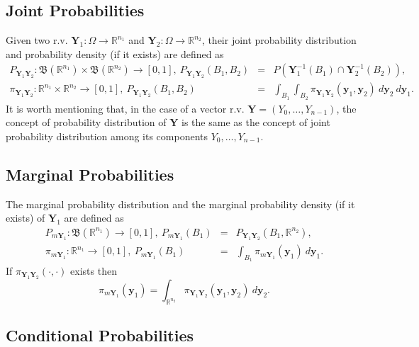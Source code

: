 \subsection{Joint Probabilities}

Given two r.v. $\mathbf{Y}_1:\Omega\rightarrow\mathbb{R}^{n_1}$ and $\mathbf{Y}_2:\Omega\rightarrow\mathbb{R}^{n_2}$,
their joint probability distribution and probability density (if it exists) are defined as
\begin{eqnarray*}
P_{\mathbf{Y}_1\mathbf{Y}_2}:\mathfrak{B}(\mathbb{R}^{n_1})\times\mathfrak{B}(\mathbb{R}^{n_2})\rightarrow [0,1],~
P_{\mathbf{Y}_1\mathbf{Y}_2}(B_1,B_2)
& = &
P(\mathbf{Y}_1^{-1}(B_1)\cap\mathbf{Y}_2^{-1}(B_2)), \\
\pi_{\mathbf{Y}_1\mathbf{Y}_2}:\mathbb{R}^{n_1}\times\mathbb{R}^{n_2}\rightarrow [0,1],~
P_{\mathbf{Y}_1\mathbf{Y}_2}(B_1,B_2)
& = &
\int_{B_1}\int_{B_2}\pi_{\mathbf{Y}_1\mathbf{Y}_2}(\mathbf{y}_1,\mathbf{y}_2)~d\mathbf{y}_2~d\mathbf{y}_1.
\end{eqnarray*}
It is worth mentioning that, in the case of a vector r.v. $\mathbf{Y}=(Y_0,\ldots,Y_{n-1})$,
the concept of probability distribution of $\mathbf{Y}$ is the same as
the concept of joint probability distribution among its components $Y_0,\ldots,Y_{n-1}$.

\subsection{Marginal Probabilities}

The marginal probability distribution and the marginal probability density (if it exists) of $\mathbf{Y}_1$ are defined as
\begin{eqnarray*}
P_{m\mathbf{Y}_1}:\mathfrak{B}(\mathbb{R}^{n_1})\rightarrow [0,1],~
P_{m\mathbf{Y}_1}(B_1)
& = &
P_{\mathbf{Y}_1\mathbf{Y}_2}(B_1,\mathbb{R}^{n_2}), \\
\pi_{m\mathbf{Y}_1}:\mathbb{R}^{n_1}\rightarrow [0,1],~
P_{m\mathbf{Y}_1}(B_1)
& = &
\int_{B_1}\pi_{m\mathbf{Y}_1}(\mathbf{y}_1)~d\mathbf{y}_1.
\end{eqnarray*}
%
If $\pi_{\mathbf{Y}_1\mathbf{Y}_2}(\cdot,\cdot)$ exists then
\begin{equation*}
\pi_{m\mathbf{Y}_1}(\mathbf{y}_1)
=
\int_{\mathbb{R}^{n_2}}\pi_{\mathbf{Y}_1\mathbf{Y}_2}(\mathbf{y}_1,\mathbf{y}_2)~d\mathbf{y}_2.
\end{equation*}

\subsection{Conditional Probabilities}

